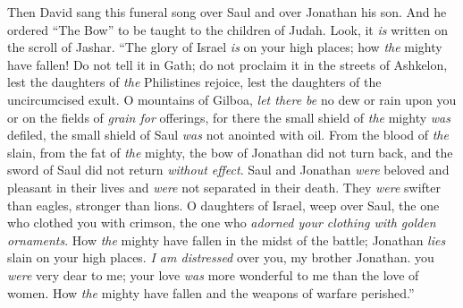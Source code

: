 \begin{biblechapter}
 Then David sang this funeral song over Saul and over Jonathan his son.
\verse And he ordered “The Bow” to be taught to the children of Judah. Look, it \textit{is} written on the scroll of Jashar.
\verse “The glory of Israel \textit{is} on your high places; how \textit{the} mighty have fallen!
\verse Do not tell it in Gath; do not proclaim it in the streets of Ashkelon, 
lest the daughters of \textit{the} Philistines rejoice, 
lest the daughters of the uncircumcised exult.
\verse O mountains of Gilboa, \textit{let there be} no dew or rain upon you 
or on the fields of \textit{grain for} offerings, 
for there the small shield of \textit{the} mighty \textit{was} defiled, 
the small shield of Saul \textit{was} not anointed with oil.
\verse From the blood of \textit{the} slain, from the fat of \textit{the} mighty, 
the bow of Jonathan did not turn back, 
and the sword of Saul did not return \textit{without effect}.
\verse Saul and Jonathan \textit{were} beloved and pleasant in their lives 
and \textit{were} not separated in their death. 
They \textit{were} swifter than eagles, stronger than lions.
\verse O daughters of Israel, weep over Saul, 
the one who clothed you with crimson, 
the one who \textit{adorned your clothing with golden ornaments}.
\verse How \textit{the} mighty have fallen in the midst of the battle; 
Jonathan \textit{lies} slain on your high places.
\verse \textit{I am distressed} over you, my brother Jonathan. 
you \textit{were} very dear to me; 
your love \textit{was} more wonderful to me than the love of women.
\verse How \textit{the} mighty have fallen and the weapons of warfare perished.”
\end{biblechapter}

